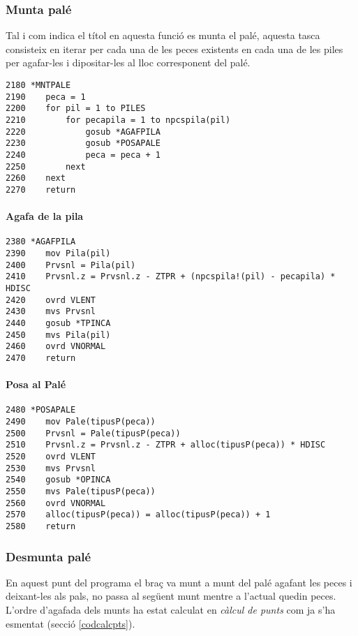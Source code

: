 \subsubsection{Munta palé}
Tal i com indica el títol en aquesta funció es munta el palé, aquesta tasca
consisteix en iterar per cada una de les peces existents en cada una de les
piles per agafar-les i dipositar-les al lloc corresponent del palé.

\begin{verbatim}
2180 *MNTPALE
2190    peca = 1
2200    for pil = 1 to PILES 
2210        for pecapila = 1 to npcspila(pil)
2220            gosub *AGAFPILA
2230            gosub *POSAPALE
2240            peca = peca + 1
2250        next
2260    next
2270    return
\end{verbatim}

\paragraph{Agafa de la pila}
\begin{verbatim}
2380 *AGAFPILA
2390    mov Pila(pil)
2400    Prvsnl = Pila(pil)
2410    Prvsnl.z = Prvsnl.z - ZTPR + (npcspila!(pil) - pecapila) * HDISC
2420    ovrd VLENT
2430    mvs Prvsnl
2440    gosub *TPINCA
2450    mvs Pila(pil)
2460    ovrd VNORMAL
2470    return
\end{verbatim}

\paragraph{Posa al Palé}
\begin{verbatim}
2480 *POSAPALE
2490    mov Pale(tipusP(peca))
2500    Prvsnl = Pale(tipusP(peca))
2510    Prvsnl.z = Prvsnl.z - ZTPR + alloc(tipusP(peca)) * HDISC
2520    ovrd VLENT
2530    mvs Prvsnl
2540    gosub *OPINCA
2550    mvs Pale(tipusP(peca))
2560    ovrd VNORMAL
2570    alloc(tipusP(peca)) = alloc(tipusP(peca)) + 1
2580    return
\end{verbatim}

\subsubsection{Desmunta palé}
En aquest punt del programa el braç va munt a munt del palé agafant les peces
i deixant-les als pals, no passa al següent munt mentre a l'actual quedin peces.
L'ordre d'agafada dels munts ha estat calculat en \emph{càlcul de punts} com ja s'ha
esmentat (secció \ref{codcalcpts}).

